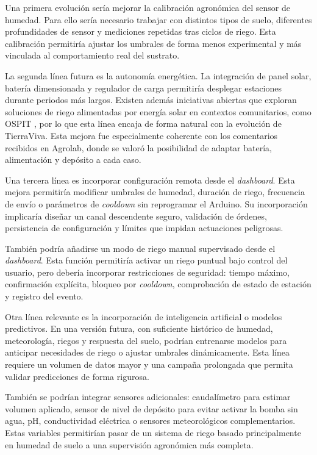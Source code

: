 Una primera evolución sería mejorar la calibración agronómica del sensor de humedad. Para ello sería necesario trabajar con distintos tipos de suelo, diferentes profundidades de sensor y mediciones repetidas tras ciclos de riego. Esta calibración permitiría ajustar los umbrales de forma menos experimental y más vinculada al comportamiento real del sustrato.

La segunda línea futura es la autonomía energética. La integración de panel solar, batería dimensionada y regulador de carga permitiría desplegar estaciones durante periodos más largos. Existen además iniciativas abiertas que exploran soluciones de riego alimentadas por energía solar en contextos comunitarios, como OSPIT \cite{apc2024,ospit2024}, por lo que esta línea encaja de forma natural con la evolución de TierraViva. Esta mejora fue especialmente coherente con los comentarios recibidos en Agrolab, donde se valoró la posibilidad de adaptar batería, alimentación y depósito a cada caso.

Una tercera línea es incorporar configuración remota desde el \textit{dashboard}. Esta mejora permitiría modificar umbrales de humedad, duración de riego, frecuencia de envío o parámetros de \textit{cooldown} sin reprogramar el Arduino. Su incorporación implicaría diseñar un canal descendente seguro, validación de órdenes, persistencia de configuración y límites que impidan actuaciones peligrosas.

También podría añadirse un modo de riego manual supervisado desde el \textit{dashboard}. Esta función permitiría activar un riego puntual bajo control del usuario, pero debería incorporar restricciones de seguridad: tiempo máximo, confirmación explícita, bloqueo por \textit{cooldown}, comprobación de estado de estación y registro del evento.

Otra línea relevante es la incorporación de inteligencia artificial o modelos predictivos. En una versión futura, con suficiente histórico de humedad, meteorología, riegos y respuesta del suelo, podrían entrenarse modelos para anticipar necesidades de riego o ajustar umbrales dinámicamente. Esta línea requiere un volumen de datos mayor y una campaña prolongada que permita validar predicciones de forma rigurosa.

También se podrían integrar sensores adicionales: caudalímetro para estimar volumen aplicado, sensor de nivel de depósito para evitar activar la bomba sin agua, pH, conductividad eléctrica o sensores meteorológicos complementarios. Estas variables permitirían pasar de un sistema de riego basado principalmente en humedad de suelo a una supervisión agronómica más completa.

